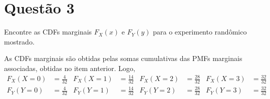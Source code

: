\section{Questão 3}
Encontre as CDFs marginais $F_X(x)$ e $F_Y(y)$ para o experimento randômico mostrado.

\begin{respostas}

As CDFs marginais são obtidas pelas somas cumulativas das PMFs marginais associadas, obtidas no item anterior. Logo,
%
\begin{align}
    F_X(X=0) &= \frac{4}{32} &
    F_X(X=1) &= \frac{14}{32} &
    F_X(X=2) &= \frac{28}{32} &
    F_X(X=3) &= \frac{32}{32} 
\\
    F_Y(Y=0) &= \frac{4}{32} &
    F_Y(Y=1) &= \frac{14}{32} &
    F_Y(Y=2) &= \frac{28}{32} &
    F_Y(Y=3) &= \frac{32}{32}
\end{align}

\end{respostas}
